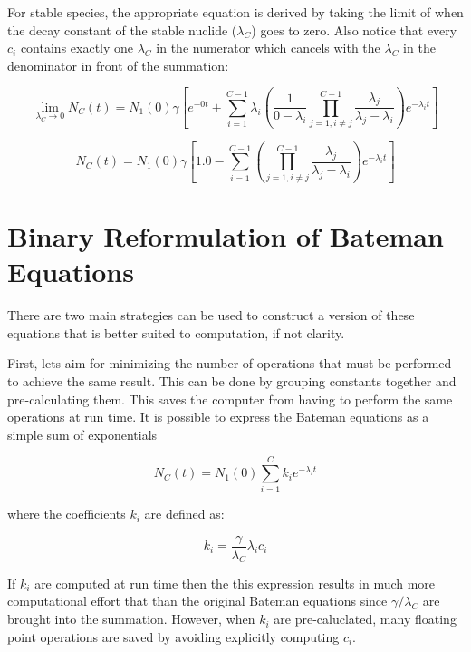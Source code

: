 \documentclass{anstrans}
\begin{document}
For stable species, the appropriate equation is derived by taking the limit
of when the decay constant of the stable nuclide ($\lambda_C$) goes to 
zero.  Also notice that every $c_i$ contains exactly one $\lambda_C$
in the numerator which cancels with the $\lambda_C$ in the denominator 
in front of the summation:

\begin{equation}
\label{lim_lam}
\lim_{\lambda_C \to 0} N_C(t) = N_1(0)  \gamma \left[e^{-0t} + \sum_{i=1}^{C-1} \lambda_i \left(\frac{1}{0 - \lambda_i} \prod_{j=1,i\ne j}^{C-1} \frac{\lambda_j}{\lambda_j - \lambda_i} \right) e^{-\lambda_i t} \right]
\end{equation}

\begin{equation}
\label{lim_lam_N_C}
N_C(t) = N_1(0)  \gamma \left[1.0 - \sum_{i=1}^{C-1} \left(\prod_{j=1,i\ne j}^{C-1} \frac{\lambda_j}{\lambda_j - \lambda_i} \right) e^{-\lambda_i t} \right]
\end{equation}


\section{Binary Reformulation of Bateman Equations}
\label{bin}
There are two main strategies can be used to construct a version of these 
equations that is better suited to computation, if not clarity. 

First, lets aim for minimizing the number of 
operations that must be performed to achieve the same result. This can be done 
by grouping constants together and pre-calculating them. This saves the 
computer from having to perform the same operations at run time.  It is 
possible to express the Bateman equations as a simple sum of exponentials

\begin{equation}
\label{N_C_bin}
N_C(t) = N_1(0) \sum_{i=1}^C k_{i} e^{-\lambda_i t}
\end{equation}

where the coefficients $k_i$ are defined as:

\begin{equation}
\label{k_i}
k_i = \frac{\gamma}{\lambda_C} \lambda_i c_i
\end{equation}

If $k_i$ are computed at run time then the this expression results in much 
more computational effort that than the original Bateman equations since $\gamma/\lambda_C$ 
are brought into the summation. However, when $k_i$ are pre-caluclated, 
many floating point operations are saved by avoiding explicitly computing $c_i$.
\end{document}
